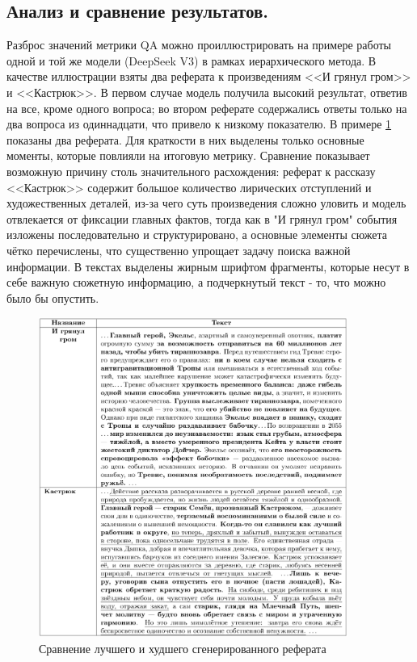 \documentclass{article}
\begin{document}
\subsection*{Анализ и сравнение результатов.}
Разброс значений метрики QA можно проиллюстрировать на примере работы одной и той же модели (DeepSeek V3) в рамках иерархического метода.
В качестве иллюстрации взяты два реферата к произведениям <<И грянул гром>> и <<Кастрюк>>. 
В первом случае модель получила высокий результат, ответив на все, кроме одного вопроса; во втором
реферате содержались ответы только на два вопроса из одиннадцати, что привело к низкому показателю. В примере \ref{fig:refs} показаны два реферата. 
Для краткости в них выделены только основные моменты, которые
повлияли на итоговую метрику. 
Сравнение показывает возможную причину столь значительного расхождения: реферат к рассказу <<Кастрюк>> содержит большое количество лирических отступлений и художественных деталей,
из-за чего суть произведения сложно уловить и модель отвлекается от фиксации главных фактов,
тогда как в "И грянул гром" события изложены последовательно и структурировано, 
а основные элементы сюжета чётко перечислены, что существенно упрощает задачу поиска важной информации.
В текстах выделены жирным шрифтом фрагменты, которые несут в себе важную сюжетную информацию, а подчеркнутый текст - то, что можно было бы опустить.

\begin{figure}[ht!]
  \centering
  \includegraphics[width=0.9\textwidth]{figures/two_ref.png}
  \caption{Сравнение лучшего и худшего сгенерированного реферата}
  \label{fig:refs}
\end{figure}
\end{document}
